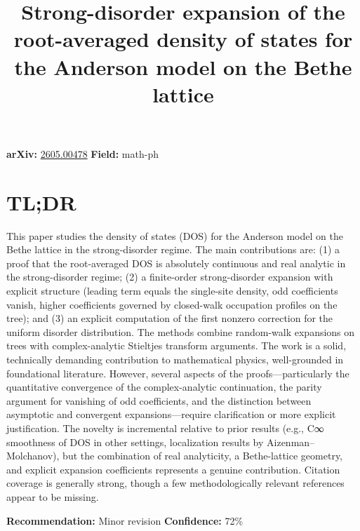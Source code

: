 \documentclass[11pt]{article}
\title{Strong-disorder expansion of the root-averaged density of states for the Anderson model on the Bethe lattice}
\date{}
\begin{document}
\maketitle

\noindent\textbf{arXiv:} \href{https://arxiv.org/abs/2605.00478}{2605.00478} \quad \textbf{Field:} math-ph\\

\section*{TL;DR}
This paper studies the density of states (DOS) for the Anderson model on the Bethe lattice in the strong-disorder regime. The main contributions are: (1) a proof that the root-averaged DOS is absolutely continuous and real analytic in the strong-disorder regime; (2) a finite-order strong-disorder expansion with explicit structure (leading term equals the single-site density, odd coefficients vanish, higher coefficients governed by closed-walk occupation profiles on the tree); and (3) an explicit computation of the first nonzero correction for the uniform disorder distribution. The methods combine random-walk expansions on trees with complex-analytic Stieltjes transform arguments. The work is a solid, technically demanding contribution to mathematical physics, well-grounded in foundational literature. However, several aspects of the proofs—particularly the quantitative convergence of the complex-analytic continuation, the parity argument for vanishing of odd coefficients, and the distinction between asymptotic and convergent expansions—require clarification or more explicit justification. The novelty is incremental relative to prior results (e.g., C∞ smoothness of DOS in other settings, localization results by Aizenman–Molchanov), but the combination of real analyticity, a Bethe-lattice geometry, and explicit expansion coefficients represents a genuine contribution. Citation coverage is generally strong, though a few methodologically relevant references appear to be missing.

\textbf{Recommendation:} Minor revision \quad \textbf{Confidence:} 72\%\\
\end{document}
